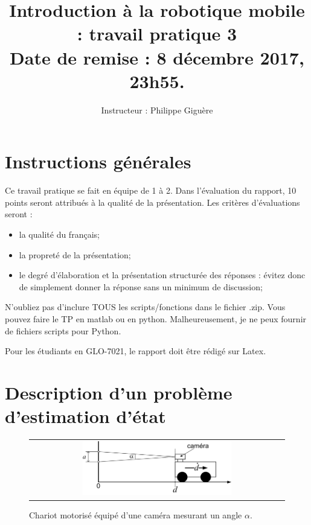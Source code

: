 \documentclass[12pt]{article}
\begin{document}
\title{Introduction à la robotique mobile : travail pratique 3  \\  Date de remise : 8 décembre 2017, 23h55.}
\author{Instructeur : Philippe Giguère}

\maketitle

\section{Instructions générales}
Ce travail pratique se fait en équipe de 1 à 2. Dans l'évaluation du rapport, 10 points seront attribués à la qualité de la présentation. Les critères d'évaluations seront :
\begin{itemize}
\item la qualité du français;
\item la propreté de la présentation;
\item le degré d'élaboration et la présentation structurée des réponses : évitez donc de simplement donner la réponse sans un minimum de discussion;
\end{itemize}
N'oubliez pas d'inclure TOUS les scripts/fonctions dans le fichier .zip. Vous pouvez faire le TP en matlab ou en python. Malheureusement, je ne peux fournir de fichiers scripts pour Python.
\vspace{1in}

Pour les étudiants en GLO-7021, le rapport doit être rédigé sur Latex.

\newpage
\section {Description d'un problème d'estimation d'état}
\label{DescriptionProbleme}

\begin{figure}[ht]
 \begin{center}
  \begin{tabular}{c}
    \includegraphics[width=0.60\textwidth]{ChariotCamera.png} 
  \end{tabular}
 \end{center}
 \vspace{-0.3in}
 \caption{Chariot motorisé équipé d'une caméra mesurant un angle $\alpha$.}
 \label{Chariot}
\end{figure}
\end{document}
